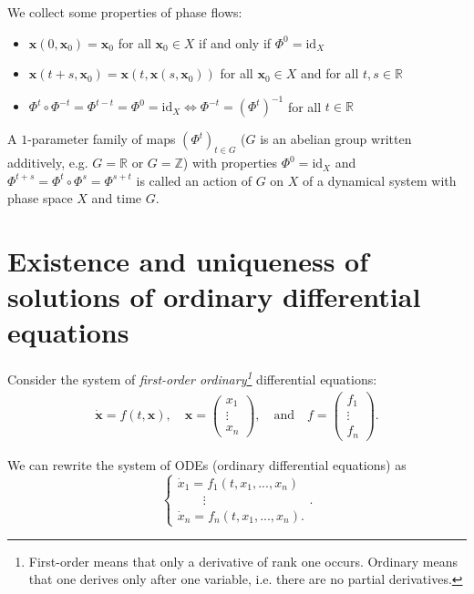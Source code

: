 \documentclass[hidelinks,a4paper, 11pt]{article}
\theoremstyle{plain}
\theoremstyle{break}
\theoremstyle{plain}
\theoremstyle{definition}
\begin{document}
We collect some properties of phase flows:
\begin{itemize}
	\item $\mathbf x(0, \mathbf x_0) = \mathbf x_0$ for all $\mathbf x_0 \in X$ if and only if $\Phi^{0} = \mathrm{id}_X$
	\item $\mathbf x(t+s, \mathbf x_0) = \mathbf x(t, \mathbf x(s, \mathbf x_0))$ for all $\mathbf x_0 \in X$ and for all $t,s \in \mathbb R$
	\item $\Phi^t \circ \Phi^{-t} = \Phi^{t-t} = \Phi^0 = \mathrm{id}_X \iff \Phi^{-t} = (\Phi^t)^{-1}$ for all $t \in\mathbb R$
\end{itemize}

A $1$-parameter family of maps $(\Phi^t)_{t \in G}$ ($G$ is an abelian group written additively, e.g. $G = \mathbb R$ or $G = \mathbb Z$) with properties $\Phi^0 = \mathrm{id}_X$ and $\Phi^{t+s} = \Phi^t \circ \Phi^s = \Phi^{s+t}$ is called an action of $G$ on $X$ of a dynamical system with phase space $X$ and time $G$.  

\section[Ordinary differential equations]{Existence and uniqueness of solutions of  ordinary differential equations}


Consider the system of \emph{first-order ordinary\footnote{First-order means that only a derivative of rank one occurs. Ordinary means that one derives only after one variable, i.e. there are no partial derivatives.}} differential equations:
\begin{gather*}
	\mathbf{\dot x} = f(t, \mathbf x), \quad \mathbf x = \begin{pmatrix}
		x_1 \\ \vdots \\ x_n
	\end{pmatrix}, \quad \text{and}\quad  f= \begin{pmatrix}
		f_1 \\ \vdots \\ f_n
	\end{pmatrix}.
\end{gather*}

We can rewrite the system of ODEs (ordinary differential equations) as
\[
	\begin{cases} 
	\dot x_1 = f_1(t,x_1,...,x_n) \\
	\quad \quad \vdots \\
	\dot x_n = f_n(t,x_1,...,x_n).
	\end{cases}.
\]
\end{document}
